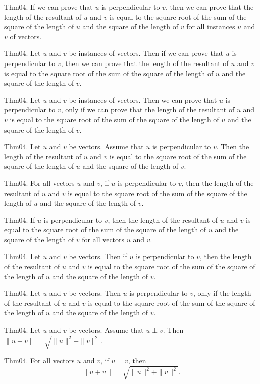 \documentclass{article}
\begin{document}
Thm04. If we can prove that $u$ is perpendicular to $v$, then we can prove that the length of the resultant of $u$ and $v$ is equal to the square root of the sum of the square of the length of $u$ and the square of the length of $v$ for all instances $u$ and $v$ of vectors.

Thm04. Let $u$ and $v$ be instances of vectors. Then if we can prove that $u$ is perpendicular to $v$, then we can prove that the length of the resultant of $u$ and $v$ is equal to the square root of the sum of the square of the length of $u$ and the square of the length of $v$.

Thm04. Let $u$ and $v$ be instances of vectors. Then we can prove that $u$ is perpendicular to $v$, only if we can prove that the length of the resultant of $u$ and $v$ is equal to the square root of the sum of the square of the length of $u$ and the square of the length of $v$.

Thm04. Let $u$ and $v$ be vectors. Assume that $u$ is perpendicular to $v$. Then the length of the resultant of $u$ and $v$ is equal to the square root of the sum of the square of the length of $u$ and the square of the length of $v$.

Thm04. For all vectors $u$ and $v$, if $u$ is perpendicular to $v$, then the length of the resultant of $u$ and $v$ is equal to the square root of the sum of the square of the length of $u$ and the square of the length of $v$.

Thm04. If $u$ is perpendicular to $v$, then the length of the resultant of $u$ and $v$ is equal to the square root of the sum of the square of the length of $u$ and the square of the length of $v$ for all vectors $u$ and $v$.

Thm04. Let $u$ and $v$ be vectors. Then if $u$ is perpendicular to $v$, then the length of the resultant of $u$ and $v$ is equal to the square root of the sum of the square of the length of $u$ and the square of the length of $v$.

Thm04. Let $u$ and $v$ be vectors. Then $u$ is perpendicular to $v$, only if the length of the resultant of $u$ and $v$ is equal to the square root of the sum of the square of the length of $u$ and the square of the length of $v$.

Thm04. Let $u$ and $v$ be vectors. Assume that $u \perp v$. Then $\| u + v \| = \sqrt{ \| u \| ^{ 2}+ \| v \| ^{ 2}}$.

Thm04. For all vectors $u$ and $v$, if $u \perp v$, then $$\| u + v \| = \sqrt{ \| u \| ^{ 2}+ \| v \| ^{ 2}}.$$
\end{document}
